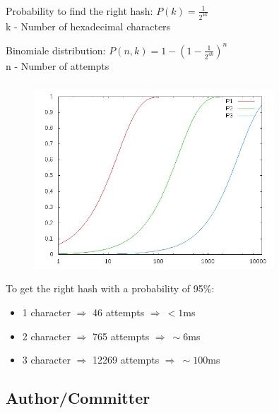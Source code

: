 \documentclass{beamer}
\begin{document}
\begin{frame}
  \frametitle{\insertsubsectionhead}
  Probability to find the right hash:
  $P(k) = \frac{1}{2^{4k}}$\\
  \hspace{4ex}k - Number of hexadecimal characters\\
  
  \medskip
  \medskip
  \medskip
  
  Binomiale distribution:
  $P(n, k) = 1 - (1 - \frac{1}{2^{4k}})^n$\\
  \hspace{4ex}n - Number of attempts\\
\end{frame}

\begin{frame}
  \frametitle{\insertsubsectionhead}
  \begin{figure}[h]
    \includegraphics[width=0.8\textwidth]{plot.jpg}
  \end{figure}
  \begin{scriptsize}
    To get the right hash with a probability of 95\%:
    \begin{itemize}
      \item 1 character $\Rightarrow$ 46 attempts $\Rightarrow\ < 1$ms
      \item 2 character $\Rightarrow$ 765 attempts $\Rightarrow\ \sim 6$ms
      \item 3 character $\Rightarrow$ 12269 attempts $\Rightarrow\ \sim100$ms
    \end{itemize}
  \end{scriptsize}
\end{frame}

\subsection{Author/Committer}
\end{document}
